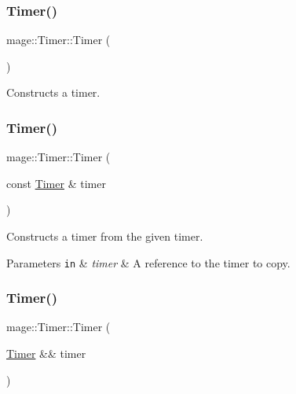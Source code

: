 \subsubsection{\texorpdfstring{Timer()}{Timer()}\hspace{0.1cm}{\footnotesize\ttfamily [1/3]}}
{\footnotesize\ttfamily mage\+::\+Timer\+::\+Timer (\begin{DoxyParamCaption}{ }\end{DoxyParamCaption})}

Constructs a timer. \hypertarget{classmage_1_1_timer_a5a1e05fde40a44cd9434572712142c23}{}\label{classmage_1_1_timer_a5a1e05fde40a44cd9434572712142c23} 
\subsubsection{\texorpdfstring{Timer()}{Timer()}\hspace{0.1cm}{\footnotesize\ttfamily [2/3]}}
{\footnotesize\ttfamily mage\+::\+Timer\+::\+Timer (\begin{DoxyParamCaption}\item[{const \hyperlink{classmage_1_1_timer}{Timer} \&}]{timer }\end{DoxyParamCaption})\hspace{0.3cm}{\ttfamily [default]}}

Constructs a timer from the given timer.


\begin{DoxyParams}[1]{Parameters}
\mbox{\tt in}  & {\em timer} & A reference to the timer to copy. \\
\hline
\end{DoxyParams}
\hypertarget{classmage_1_1_timer_a5fb4b89725b16e0d4b1fbae2f95f30cb}{}\label{classmage_1_1_timer_a5fb4b89725b16e0d4b1fbae2f95f30cb} 
\subsubsection{\texorpdfstring{Timer()}{Timer()}\hspace{0.1cm}{\footnotesize\ttfamily [3/3]}}
{\footnotesize\ttfamily mage\+::\+Timer\+::\+Timer (\begin{DoxyParamCaption}\item[{\hyperlink{classmage_1_1_timer}{Timer} \&\&}]{timer }\end{DoxyParamCaption})\hspace{0.3cm}{\ttfamily [default]}}

